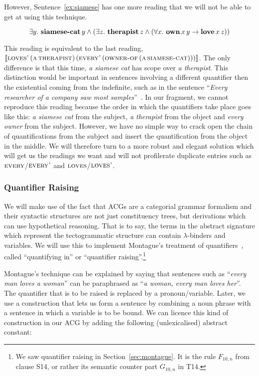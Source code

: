 However, Sentence~\ref{ex:siamese} has one more reading that we will not be
able to get at using this technique.

$$
\exists y.\ \ap{\obj{siamese-cat}}{y} \land (\exists z.\ \ap{\obj{therapist}}{z} \land (\forall x.\ \app{\obj{own}}{x}{y} \to \app{\obj{love}}{x}{z}))
$$

This reading is equivalent to the last reading,
$\llbracket \textsc{loves'}\,(\textsc{a}\,\textsc{therapist})\,(\textsc{every'}\,(\textsc{owner-of}\,(\textsc{a}\,\textsc{siamese-cat}))) \rrbracket$. The
only difference is that this time, \emph{a siamese cat} has scope over
\emph{a therapist}. This distinction would be important in sentences
involving a different quantifier then the existential coming from the
indefinite, such as in the sentence ``\emph{Every researcher of a company
  saw most samples}''~\cite{burchardt2004computational}. In our fragment,
we cannot reproduce this reading because the order in which the quantifiers
take place goes like this: \emph{a siamese cat} from the subject, \emph{a
  therapist} from the object and \emph{every owner} from the
subject. However, we have no simple way to crack open the chain of
quantifications from the subject and insert the quantification from the
object in the middle. We will therefore turn to a more robust and elegant
solution which will get us the readings we want and will not profilerate
duplicate entries such as $\textsc{every}$/$\textsc{every'}$ and
$\textsc{loves}$/$\textsc{loves'}$.


\subsubsection{Quantifier Raising}

We will make use of the fact that ACGs are a categorial grammar formalism
and their syntactic structures are not just constituency trees, but
derivations which can use hypothetical reasoning. That is to say, the terms
in the abstract signature which represent the tectogrammatic structure can
contain $\lambda$-binders and variables. We will use this to implement
Montague's treatment of quantifiers~\cite{montague1973proper}, called
``quantifying in'' or ``quantifier raising''.\footnote{We saw quantifier
  raising in Section~\ref{sec:montague}. It is the rule $F_{10,n}$ from
  clause S14, or rather its semantic counter part $G_{10,n}$ in T14.}

Montague's technique can be explained by saying that sentences such as
``\emph{every man loves a woman}'' can be paraphrased as ``\emph{a woman,
  every man loves her}''. The quantifier that is to be raised is replaced
by a pronoun/variable. Later, we use a construction that lets us form a
sentence by combining a noun phrase with a sentence in which a variable is
to be bound. We can licence this kind of construction in our ACG by adding
the following (unlexicalised) abstract constant:


